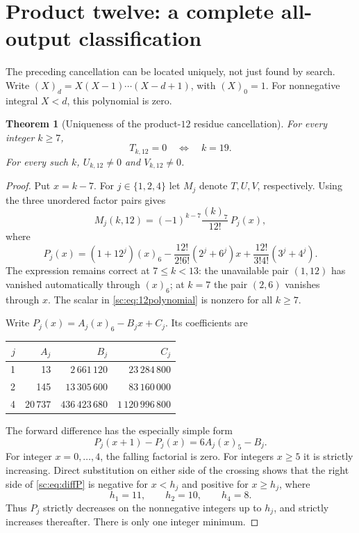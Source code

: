 \documentclass[11pt,a4paper]{article}
\numberwithin{equation}{section}
\newtheorem{theorem}{Theorem}[section]
\theoremstyle{definition}
\theoremstyle{remark}
\newcommand{\fall}[2]{(#1)_{#2}}
\begin{document}
\section{Product twelve: a complete all-output classification}\label{sc:sec:twelve}

The preceding cancellation can be located uniquely, not just found by
search. Write $\fall Xd=X(X-1)\cdots(X-d+1)$, with $\fall X0=1$.
For nonnegative integral $X<d$, this polynomial is zero.

\begin{theorem}[Uniqueness of the product-$12$ residue cancellation]\label{sc:thm:unique12}
For every integer $k\ge7$,
\[
 T_{k,12}=0\quad\Longleftrightarrow\quad k=19.
\]
For every such $k$, $U_{k,12}\ne0$ and $V_{k,12}\ne0$.
\end{theorem}
\begin{proof}
Put $x=k-7$. For $j\in\{1,2,4\}$ let $M_j$ denote $T,U,V$, respectively.
Using the three unordered factor pairs gives
\begin{equation}\label{sc:eq:12polynomial}
 M_j(k,12)=(-1)^{k-7}\frac{\fall k7}{12!}\,P_j(x),
\end{equation}
where
\begin{equation}\label{sc:eq:Pj}
 P_j(x)=(1+12^j)\fall x6
 -\frac{12!}{2!6!}(2^j+6^j)x
 +\frac{12!}{3!4!}(3^j+4^j).
\end{equation}
The expression remains correct at $7\le k<13$: the unavailable pair
$(1,12)$ has vanished automatically through $\fall x6$; at $k=7$ the
pair $(2,6)$ vanishes through $x$. The scalar in \eqref{sc:eq:12polynomial}
is nonzero for all $k\ge7$.

Write $P_j(x)=A_j\fall x6-B_jx+C_j$. Its coefficients are
\begin{center}
\small
\begin{tabular}{@{}rrrr@{}}
\toprule
$j$&$A_j$&$B_j$&$C_j$\\\midrule
1&13&$2\,661\,120$&$23\,284\,800$\\
2&145&$13\,305\,600$&$83\,160\,000$\\
4&$20\,737$&$436\,423\,680$&$1\,120\,996\,800$\\\bottomrule
\end{tabular}
\end{center}
The forward difference has the especially simple form
\begin{equation}\label{sc:eq:diffP}
 P_j(x+1)-P_j(x)=6A_j\fall x5-B_j.
\end{equation}
For integer $x=0,\ldots,4$, the falling factorial is zero. For integers
$x\ge5$ it is strictly increasing. Direct substitution on either side of
the crossing shows that the right side of \eqref{sc:eq:diffP} is negative for
$x<h_j$ and positive for $x\ge h_j$, where
\[
 h_1=11,\qquad h_2=10,\qquad h_4=8.
\]
Thus $P_j$ strictly decreases on the nonnegative integers up to $h_j$,
and strictly increases thereafter. There is only one integer minimum.


\end{proof}
\end{document}
